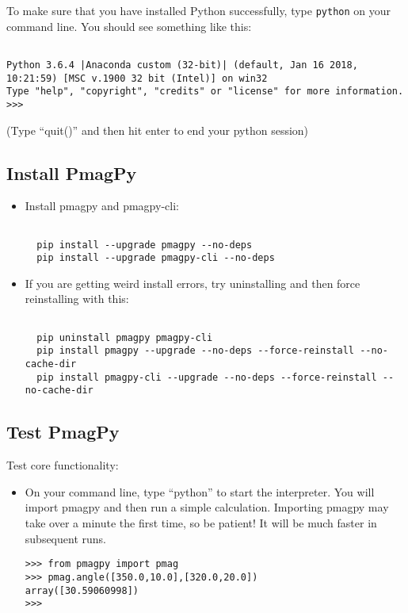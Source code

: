 \documentclass[11pt]{article}
\begin{document}
To make sure that you have installed Python successfully, type \texttt{python} on your command line.  You should see something like this: \begin{verbatim}

Python 3.6.4 |Anaconda custom (32-bit)| (default, Jan 16 2018, 10:21:59) [MSC v.1900 32 bit (Intel)] on win32
Type "help", "copyright", "credits" or "license" for more information.
>>>\end{verbatim}
(Type ``quit()'' and then hit enter to end your python session)


\subsection{Install PmagPy}


\begin{itemize}
\item Install pmagpy and pmagpy-cli:

\begin{verbatim}

  pip install --upgrade pmagpy --no-deps
  pip install --upgrade pmagpy-cli --no-deps
\end{verbatim}
     \item If you are getting weird install errors, try uninstalling and then force reinstalling with this:

\begin{verbatim}

  pip uninstall pmagpy pmagpy-cli
  pip install pmagpy --upgrade --no-deps --force-reinstall --no-cache-dir
  pip install pmagpy-cli --upgrade --no-deps --force-reinstall --no-cache-dir
\end{verbatim}

   \end{itemize}

\subsection{Test PmagPy}

Test core functionality:

\begin{itemize}
  \item On your command line, type ``python'' to start the interpreter.  You will import pmagpy and then run a simple calculation.  Importing pmagpy may take over a minute the first time, so be patient!  It will be much faster in subsequent runs.

\begin{verbatim}
>>> from pmagpy import pmag
>>> pmag.angle([350.0,10.0],[320.0,20.0])
array([30.59060998])
>>>
\end{verbatim}

\end{itemize}
\end{document}
